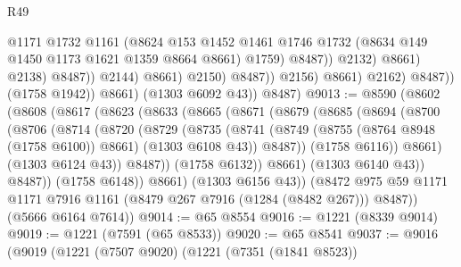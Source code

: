\begin{lexlean}{R49}
\begin{coremodule}
                                              @1171
                                              @1732
                                              @1161
                                              (@8624
                                                @153
                                                @1452
                                                @1461
                                                @1746
                                                @1732
                                                (@8634 @149 @1450 @1173 @1621 @1359 @8664 @8661)
                                                @1759)
                                              @8487))
                                          @2132)
                                        @8661)
                                      @2138)
                                    @8487))
                                @2144)
                              @8661)
                            @2150)
                          @8487))
                      @2156)
                    @8661)
                  @2162)
                @8487))
            (@1758 @1942))
          @8661)
        (@1303 @6092 @43))
      @8487)
@9013 := @8590
    (@8602
      (@8608
        (@8617
          (@8623
            (@8633
              (@8665
                (@8671
                  (@8679
                    (@8685
                      (@8694
                        (@8700
                          (@8706
                            (@8714
                              (@8720
                                (@8729
                                  (@8735
                                    (@8741
                                      (@8749
                                        (@8755 (@8764 @8948 (@1758 @6100)) @8661)
                                        (@1303 @6108 @43))
                                      @8487))
                                  (@1758 @6116))
                                @8661)
                              (@1303 @6124 @43))
                            @8487))
                        (@1758 @6132))
                      @8661)
                    (@1303 @6140 @43))
                  @8487))
              (@1758 @6148))
            @8661)
          (@1303 @6156 @43))
        (@8472 @975 @59 @1171 @1171 @7916 @1161 (@8479 @267 @7916 (@1284 (@8482 @267))) @8487))
      (@5666 @6164 @7614))
@9014 := @65 @8554
@9016 := @1221 (@8339 @9014)
@9019 := @1221 (@7591 (@65 @8533))
@9020 := @65 @8541
@9037 := @9016
    (@9019
      (@1221
        (@7507 @9020)
        (@1221
          (@7351 (@1841 @8523))

\end{coremodule}
\end{lexlean}
